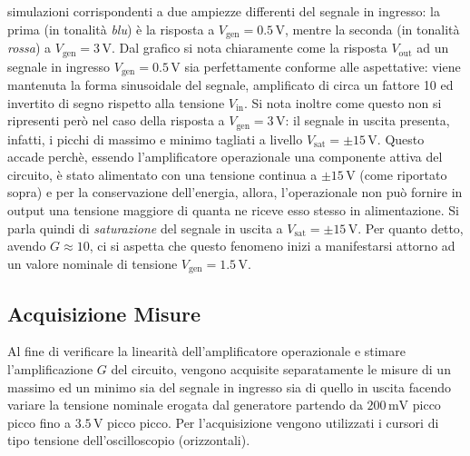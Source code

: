 \documentclass[a4paper,11pt]{article} %
\begin{document}
\noindent simulazioni corrispondenti a due ampiezze differenti del segnale in ingresso: la prima (in tonalità
\textit{blu}) è la risposta a $V_{\text{gen}}=0.5\,\si{\volt}$, mentre la seconda (in tonalità \textit{rossa}) a
$V_{\text{gen}}=3\,\si{\volt}$. Dal grafico si nota chiaramente come la risposta $V_{\text{out}}$ ad un segnale in
ingresso $V_{\text{gen}}=0.5\,\si{\volt}$ sia perfettamente conforme alle aspettative: viene mantenuta la forma
sinusoidale del segnale, amplificato di circa un fattore 10 ed invertito di segno rispetto alla tensione
$V_{\text{in}}$. Si nota inoltre come questo non si ripresenti però nel caso della risposta a
$V_{\text{gen}}=3\,\si{\volt}$: il segnale in uscita presenta, infatti, i picchi di massimo e minimo tagliati a livello
$V_{\text{sat}}=\pm 15\,\si{\volt}$. Questo accade perchè, essendo l'amplificatore operazionale una componente attiva
del circuito, è stato alimentato con una tensione continua a $\pm 15\,\si{\volt}$ (come riportato sopra) e per la
conservazione dell'energia, allora, l'operazionale non può fornire in output una tensione maggiore di quanta ne riceve
esso stesso in alimentazione. Si parla quindi di \textit{saturazione} del segnale in uscita a $V_{\text{sat}}=\pm
15\,\si{\volt}$. Per quanto detto,  avendo $G \approx 10$, ci si aspetta che questo fenomeno inizi a manifestarsi
attorno ad un valore nominale di tensione $V_{\text{gen}}=1.5\,\si{\volt}$.



\subsection{Acquisizione Misure}

Al fine di verificare la linearità dell'amplificatore operazionale e stimare l'amplificazione $G$ del circuito, vengono
acquisite separatamente le misure di un massimo ed un minimo sia del segnale in ingresso sia di quello in uscita facendo
variare la tensione nominale erogata dal generatore partendo da $200\,\si{\mV}$ picco picco fino a $3.5\,\si{\volt}$ picco
picco. Per l'acquisizione vengono utilizzati i cursori di tipo tensione dell'oscilloscopio (orizzontali). 


\end{document}
